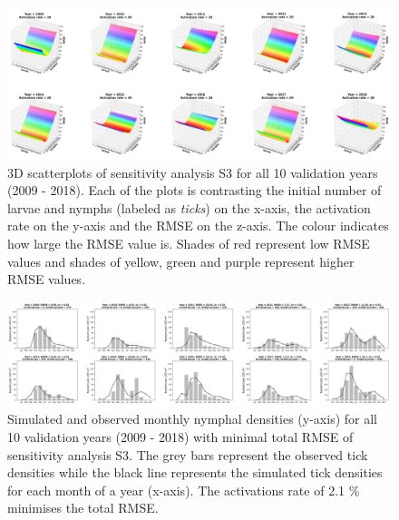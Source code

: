\documentclass[a4paper, 11pt]{scrartcl}
\begin{document}
\begin{figure}
\centering
\includegraphics[width=\linewidth]{figures/independent_initial_ticks_with_beech_error.png}
\caption{3D scatterplots of sensitivity analysis S3 for all 10 validation years (2009 - 2018). Each of the plots is contrasting the initial number of larvae and nymphs
(labeled as \textit{ticks}) on the x-axis, the activation rate on the y-axis and the RMSE on the z-axis. The colour indicates how large the RMSE value is. Shades of red
represent low RMSE values and shades of yellow, green and purple represent higher RMSE values.}
\label{fig:independent_initial_ticks_with_beech_error_rotated}
\end{figure}

\begin{figure}
\centering
\includegraphics[width=\linewidth]{figures/independent_initial_ticks_with_beech.png}
\caption{Simulated and observed monthly nymphal densities (y-axis) for all 10 validation years (2009 - 2018) with minimal total RMSE of sensitivity analysis S3. The grey bars
represent the observed tick densities while the black line represents the simulated tick densities for each month of a year (x-axis). The activations rate of 2.1 \% minimises
the total RMSE.}
\label{fig:independent_initial_ticks_with_beech_rotated}
\end{figure}
\end{document}

